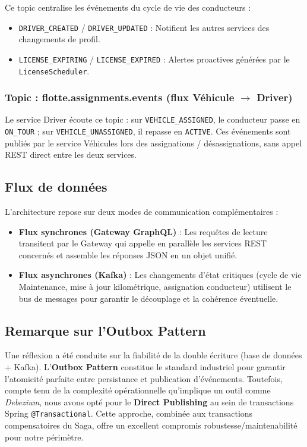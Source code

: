\documentclass[12pt,a4paper]{article}
\begin{document}
Ce topic centralise les événements du cycle de vie des conducteurs :
\begin{itemize}
    \item \texttt{DRIVER\_CREATED} / \texttt{DRIVER\_UPDATED} : Notifient les autres services des changements de profil.
    \item \texttt{LICENSE\_EXPIRING} / \texttt{LICENSE\_EXPIRED} : Alertes proactives générées par le \texttt{LicenseScheduler}.
\end{itemize}

\subsubsection{Topic : flotte.assignments.events (flux Véhicule $\rightarrow$ Driver)}

Le service Driver écoute ce topic : sur \texttt{VEHICLE\_ASSIGNED}, le conducteur passe en \texttt{ON\_TOUR} ; sur \texttt{VEHICLE\_UNASSIGNED}, il repasse en \texttt{ACTIVE}. Ces événements sont publiés par le service Véhicules lors des assignations / désassignations, sans appel REST direct entre les deux services.

\subsection{Flux de données}

L'architecture repose sur deux modes de communication complémentaires :

\begin{itemize}
    \item \textbf{Flux synchrones (Gateway GraphQL)} : Les requêtes de lecture transitent par le Gateway qui appelle en parallèle les services REST concernés et assemble les réponses JSON en un objet unifié.
    \item \textbf{Flux asynchrones (Kafka)} : Les changements d'état critiques (cycle de vie Maintenance, mise à jour kilométrique, assignation conducteur) utilisent le bus de messages pour garantir le découplage et la cohérence éventuelle.
\end{itemize}

\subsection{Remarque sur l'Outbox Pattern}

Une réflexion a été conduite sur la fiabilité de la double écriture (base de données + Kafka). L'\textbf{Outbox Pattern} constitue le standard industriel pour garantir l'atomicité parfaite entre persistance et publication d'événements. Toutefois, compte tenu de la complexité opérationnelle qu'implique un outil comme \textit{Debezium}, nous avons opté pour le \textbf{Direct Publishing} au sein de transactions Spring \texttt{@Transactional}. Cette approche, combinée aux transactions compensatoires du Saga, offre un excellent compromis robustesse/maintenabilité pour notre périmètre.
\end{document}
